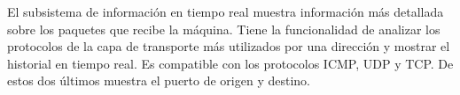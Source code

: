 El subsistema de información en tiempo real muestra información más detallada sobre los paquetes que recibe la máquina. Tiene la funcionalidad de analizar los protocolos de la capa de transporte más utilizados por una dirección y mostrar el historial en tiempo real. Es compatible con los protocolos ICMP, UDP y TCP. De estos dos últimos muestra el puerto de origen y destino.